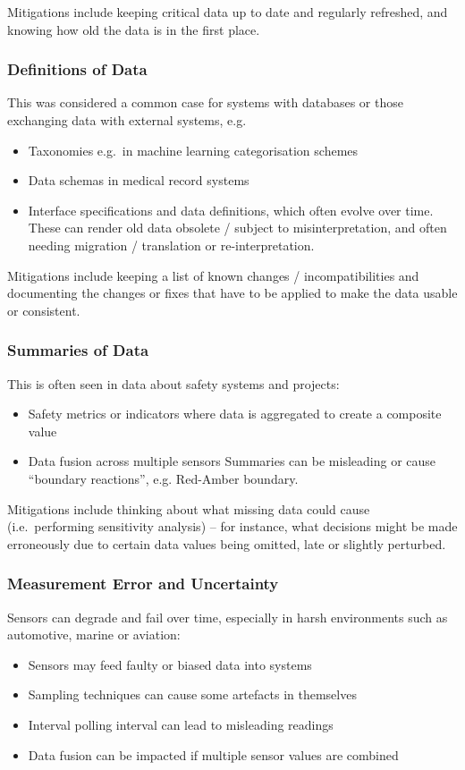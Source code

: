 Mitigations include keeping \gls{critical data} up to date and regularly refreshed, and knowing how old the data is in the first place.

\subsubsection{Definitions of Data}\label{bkm:dark8}
This was considered a common case for systems with \glspl{database} or those exchanging data with external systems, e.g.
\begin{itemize}
\item Taxonomies e.g.\ in machine learning categorisation schemes
  \item Data schemas in medical record systems 
  \item Interface specifications and data definitions, which often evolve over time. These can render old data obsolete / subject to misinterpretation, and often needing migration / translation or re-interpretation.
\end{itemize}

Mitigations include keeping a list of known changes / incompatibilities and documenting the changes or fixes that have to be applied to make the data usable or consistent.

\subsubsection{Summaries of Data}\label{bkm:dark9}
This is often seen in data about safety systems and projects:
\begin{itemize}
\item Safety metrics or indicators where data is aggregated to create a composite value
  \item Data fusion across multiple sensors
Summaries can be misleading or cause “boundary reactions”, e.g. Red-Amber boundary.
\end{itemize}

Mitigations include thinking about what missing data could cause (i.e.\ performing sensitivity analysis) -- for instance, what decisions might be made erroneously due to certain data values being omitted, late or slightly perturbed.

\subsubsection{Measurement Error and Uncertainty}\label{bkm:dark10}
Sensors can degrade and fail over time, especially in harsh environments such as automotive, marine or aviation:
\begin{itemize}
\item Sensors may feed faulty or biased data into systems
  \item Sampling techniques can cause some artefacts in themselves
  \item Interval polling interval can lead to misleading readings
  \item Data fusion can be impacted if multiple sensor values are combined
\end{itemize}

